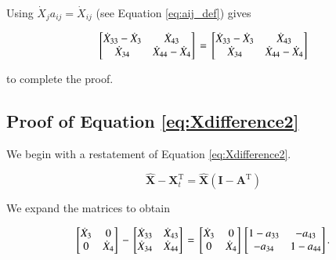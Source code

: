 \documentclass[authoryear,preprint,review,12pt]{elsarticle}
\let\oldhat\hat
\renewcommand{\vec}[1]{\mathbf{#1}}
\renewcommand{\hat}[1]{\oldhat{\mathbf{#1}}}
\begin{document}
\noindent Using $\dot{X}_j a_{ij} = \dot{X}_{ij}$ (see Equation \ref{eq:aij_def}) gives

\begin{equation} \label{eq:Xdifference1Proof-4}
\begin{bmatrix} 	\dot{X}_{33} - \dot{X}_3 & \dot{X}_{43}	\\
				\dot{X}_{34} & \dot{X}_{44} - \dot{X}_4	\\
\end{bmatrix} \\
= \\
\begin{bmatrix} 	\dot{X}_{33} - \dot{X}_3 & \dot{X}_{43}	\\
				\dot{X}_{34} & \dot{X}_{44} - \dot{X}_4	\\
\end{bmatrix}
\end{equation}

\noindent to complete the proof.

\subsection{Proof of Equation \ref{eq:Xdifference2}}

We begin with a restatement of Equation \ref{eq:Xdifference2}.

\begin{equation} \label{eq:Xdifference2Proof-1}
	\hat{\vec{X}} - \vec{X}_t^\mathrm{T} = \hat{\vec{X}}(\vec{I} - \vec{A}^\mathrm{T})
\end{equation}

\noindent We expand the matrices to obtain

\begin{equation} \label{eq:Xdifference2Proof-2}
\begin{bmatrix} 	\dot{X}_{3} & 0	\\
				0 & \dot{X}_{4}	\\
\end{bmatrix} \\
 - \\
\begin{bmatrix} 	\dot{X}_{33} & \dot{X}_{43}	\\
				\dot{X}_{34} & \dot{X}_{44}	\\
\end{bmatrix} \\
= \\
\begin{bmatrix} 	\dot{X}_{3} & 0	\\
				0 & \dot{X}_{4}	\\
\end{bmatrix} \\
\begin{bmatrix} 	1 - a_{33} & -a_{43}	\\
				-a_{34} & 1 - a_{44}	\\
\end{bmatrix}.
\end{equation}
\end{document}
